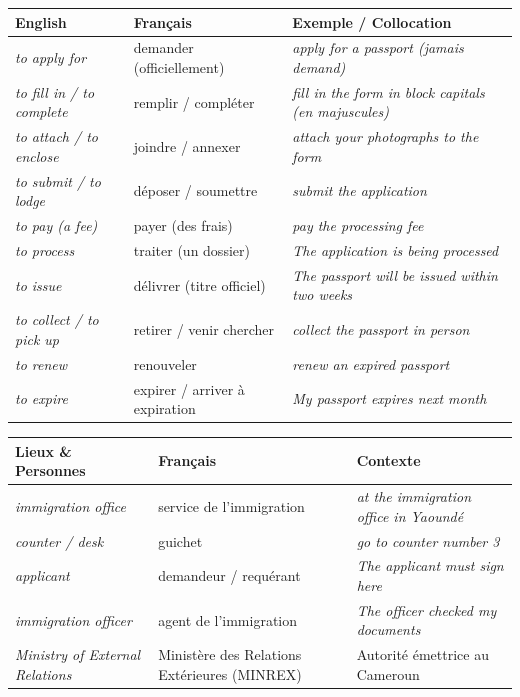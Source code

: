 \documentclass[11pt]{article}
\newcommand{\eng}[1]{\ifmmode\text{\textit{#1}}\else\begingroup\selectlanguage{english}\itshape #1\endgroup\fi}
\begin{document}
\begin{propriete}
\begin{center}
\begin{tabularx}{\linewidth}{|X|X|X|}\hline
\rowcolor{popblueL} \textbf{English} & \textbf{Français} & \textbf{Exemple / Collocation} \\ \hline
\eng{to apply for} & demander (officiellement) & \eng{apply for a passport} (jamais \eng{demand}) \\ \hline
\eng{to fill in / to complete} & remplir / compléter & \eng{fill in the form in block capitals} (en majuscules) \\ \hline
\eng{to attach / to enclose} & joindre / annexer & \eng{attach your photographs to the form} \\ \hline
\eng{to submit / to lodge} & déposer / soumettre & \eng{submit the application} \\ \hline
\eng{to pay (a fee)} & payer (des frais) & \eng{pay the processing fee} \\ \hline
\eng{to process} & traiter (un dossier) & \eng{The application is being processed} \\ \hline
\eng{to issue} & délivrer (titre officiel) & \eng{The passport will be issued within two weeks} \\ \hline
\eng{to collect / to pick up} & retirer / venir chercher & \eng{collect the passport in person} \\ \hline
\eng{to renew} & renouveler & \eng{renew an expired passport} \\ \hline
\eng{to expire} & expirer / arriver à expiration & \eng{My passport expires next month} \\ \hline
\end{tabularx}
\end{center}

\begin{center}
\begin{tabularx}{\linewidth}{|X|X|X|}\hline
\rowcolor{poporangeL} \textbf{Lieux \& Personnes} & \textbf{Français} & \textbf{Contexte} \\ \hline
\eng{immigration office} & service de l'immigration & \eng{at the immigration office in Yaoundé} \\ \hline
\eng{counter / desk} & guichet & \eng{go to counter number 3} \\ \hline
\eng{applicant} & demandeur / requérant & \eng{The applicant must sign here} \\ \hline
\eng{immigration officer} & agent de l'immigration & \eng{The officer checked my documents} \\ \hline
\eng{Ministry of External Relations} & Ministère des Relations Extérieures (MINREX) & Autorité émettrice au Cameroun \\ \hline
\end{tabularx}
\end{center}
\end{propriete}
\end{document}
